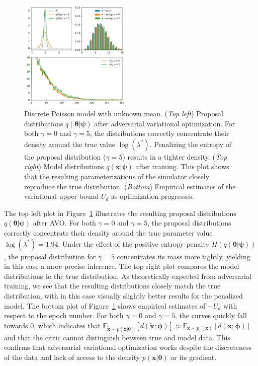 \documentclass[twocolumn,superscriptaddress,aps]{revtex4-1}
\newcommand{\qxpsi}{q(\mathbf{x}|\bfpsi)}
\newcommand{\bftheta}{{\bm \theta}}
\newcommand{\bfpsi}{{\bm \psi}}
\newcommand{\bfphi}{{\bm \phi}}
\newcommand{\bfx}{\mathbf{x}}
\theoremstyle{plain}
\begin{document}
\begin{figure}
    \centering
    \includegraphics[width=0.48\textwidth]{figures/poisson.pdf}
    \caption{Discrete Poisson model with unknown mean.
             ({\it Top left}) Proposal distributions $q(\bftheta|\bfpsi)$ after adversarial variational optimization. For both $\gamma=0$ and $\gamma=5$, the distributions correctly concentrate their density around
                        the true value $\log(\lambda^*)$. Penalizing the entropy of the proposal distribution ($\gamma=5$) results in a tighter density.
             ({\it Top right}) Model distributions $\qxpsi$ after training. This plot shows that the resulting parameterizations of the simulator closely reproduce the true distribution.
             ({\it Bottom}) Empirical estimates of the variational upper bound $U_d$ as optimization progresses.
             }\label{fig:poisson}
\end{figure}

The top left plot in Figure~\ref{fig:poisson} illustrates the resulting proposal
distributions $q(\bftheta|\bfpsi)$ after AVO.  For
both $\gamma=0$ and $\gamma=5$, the proposal distributions correctly concentrate
their density around the true parameter value $\log(\lambda^*) = 1.94$. Under
the effect of the positive entropy penalty $H(q(\bftheta|\bfpsi))$,
the proposal distribution for $\gamma=5$ concentrates its mass more tightly,
yielding in this case a more precise inference.  The top right plot compares the
model distributions to the true distribution.  As theoretically expected from
adversarial training, we see that the resulting distributions closely match
the true distribution, with in this case visually slightly better results for the penalized
model.  The bottom plot of Figure~\ref{fig:poisson} shows empirical estimates
of $-U_d$ with respect to the epoch number. For both $\gamma=0$ and $\gamma=5$,
the curves quickly fall towards $0$, which indicates that
$\mathbb{E}_{\tilde{\mathbf{x}} \sim p(\mathbf{x}|\bftheta)}
[d(\tilde{\mathbf{x}};\bfphi)] \approx \mathbb{E}_{\mathbf{x} \sim
p_r(\mathbf{x})} [d(\mathbf{x};\bfphi)]$ and that the critic cannot distinguish
between true and model data. This confirms that adversarial variational optimization
works despite the discreteness of the data and lack of access to the
density $p(\bfx | \bftheta)$ or its gradient.
\end{document}
